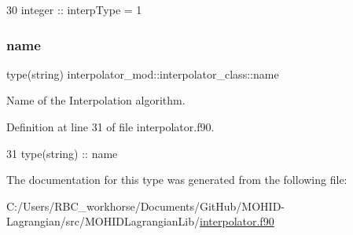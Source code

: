 \begin{DoxyCode}
30         \textcolor{keywordtype}{integer} :: interpType = 1
\end{DoxyCode}
\mbox{\label{structinterpolator__mod_1_1interpolator__class_ac0d7be3d07fb72dec420461e031d6983}} 
\subsubsection{\texorpdfstring{name}{name}}
{\footnotesize\ttfamily type(string) interpolator\+\_\+mod\+::interpolator\+\_\+class\+::name\hspace{0.3cm}{\ttfamily [private]}}



Name of the Interpolation algorithm. 



Definition at line 31 of file interpolator.\+f90.


\begin{DoxyCode}
31         \textcolor{keywordtype}{type}(string) :: name
\end{DoxyCode}


The documentation for this type was generated from the following file\+:\begin{DoxyCompactItemize}
\item 
C\+:/\+Users/\+R\+B\+C\+\_\+workhorse/\+Documents/\+Git\+Hub/\+M\+O\+H\+I\+D-\/\+Lagrangian/src/\+M\+O\+H\+I\+D\+Lagrangian\+Lib/\mbox{\hyperlink{interpolator_8f90}{interpolator.\+f90}}\end{DoxyCompactItemize}

